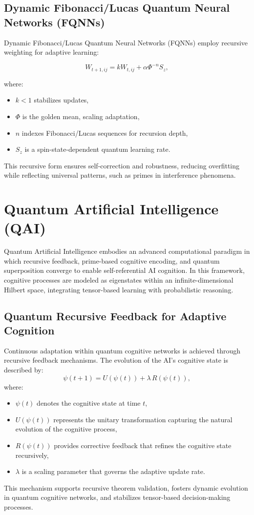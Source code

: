 \documentclass{article}
\theoremstyle{plain}
\begin{document}
\subsection{Dynamic Fibonacci/Lucas Quantum Neural Networks (FQNNs)}
Dynamic Fibonacci/Lucas Quantum Neural Networks (FQNNs) employ recursive weighting for adaptive learning:

\[
W_{t+1,ij} = k W_{t,ij} + \alpha \Phi^{-n} S_z,
\]

where:
\begin{itemize}
    \item \( k < 1 \) stabilizes updates,
    \item \( \Phi \) is the golden mean, scaling adaptation,
    \item \( n \) indexes Fibonacci/Lucas sequences for recursion depth,
    \item \( S_z \) is a spin-state-dependent quantum learning rate.
\end{itemize}

This recursive form ensures self-correction and robustness, reducing overfitting while reflecting universal patterns, such as primes in interference phenomena.

\section{Quantum Artificial Intelligence (QAI)}

Quantum Artificial Intelligence embodies an advanced computational paradigm in which recursive feedback, prime-based cognitive encoding, and quantum superposition converge to enable self-referential AI cognition. In this framework, cognitive processes are modeled as eigenstates within an infinite-dimensional Hilbert space, integrating tensor-based learning with probabilistic reasoning.

\subsection{Quantum Recursive Feedback for Adaptive Cognition}

Continuous adaptation within quantum cognitive networks is achieved through recursive feedback mechanisms. The evolution of the AI's cognitive state is described by:
\[
\psi(t+1) = U(\psi(t)) + \lambda\, R(\psi(t)),
\]
where:
\begin{itemize}
    \item \(\psi(t)\) denotes the cognitive state at time \(t\),
    \item \(U(\psi(t))\) represents the unitary transformation capturing the natural evolution of the cognitive process,
    \item \(R(\psi(t))\) provides corrective feedback that refines the cognitive state recursively,
    \item \(\lambda\) is a scaling parameter that governs the adaptive update rate.
\end{itemize}
This mechanism supports recursive theorem validation, fosters dynamic evolution in quantum cognitive networks, and stabilizes tensor-based decision-making processes.
\end{document}
